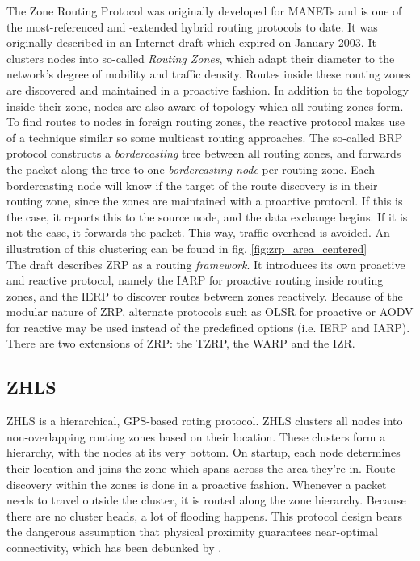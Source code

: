 \documentclass[a4paper,10pt]{scrartcl}
\begin{document}
The Zone Routing Protocol was originally developed for \glspl{MANET} and is one of the most-referenced and -extended hybrid routing protocols to date. It was originally described in an Internet-draft which expired on January 2003\cite{ZRP-Draft}.
It clusters nodes into so-called \emph{Routing Zones}, which adapt their diameter to the network's degree of mobility and traffic density. Routes inside these routing zones are discovered and maintained in a proactive fashion. In addition to the topology inside their zone, nodes are also aware of topology which all routing zones form.
To find routes to nodes in foreign routing zones, the reactive protocol makes use of a technique similar so some multicast routing approaches. The so-called \gls{BRP}\cite{draft-ietf-manet-zone-brp} protocol constructs a \emph{bordercasting} tree between all routing zones, and forwards the packet along the tree to one \emph{bordercasting node} per routing zone. Each bordercasting node will know if the target of the route discovery is in their routing zone, since the zones are maintained with a proactive protocol. If this is the case, it reports this to the source node, and the data exchange begins. If it is not the case, it forwards the packet. This way, traffic overhead is avoided. An illustration of this clustering can be found in fig. \ref{fig:zrp_area_centered}\\
The draft describes ZRP as a routing \emph{framework}. It introduces its own proactive and reactive protocol, namely the \gls{IARP}\cite{draft-ietf-manet-zone-iarp} for proactive routing inside routing zones, and the \gls{IERP}\cite{draft-ietf-manet-zone-ierp} to discover routes between zones reactively. Because of the modular nature of ZRP, alternate protocols such as OLSR for proactive or AODV for reactive may be used instead of the predefined options (i.e. IERP and IARP).\\
There are two extensions of ZRP: the \gls{TZRP}\cite{TZRP}, the \gls{WARP}\cite{WARP} and the \gls{IZR}\cite{IZR}. %

\subsection{\gls{ZHLS}}
\label{subsec:zhls}
ZHLS is a hierarchical, GPS-based roting protocol.
ZHLS clusters all nodes into non-overlapping routing zones based on their location. These clusters form a hierarchy, with the nodes at its very bottom.
On startup, each node determines their location and joins the zone which spans across the area they're in. Route discovery within the zones is done in a proactive fashion. Whenever a packet needs to travel outside the cluster, it is routed along the zone hierarchy. Because there are no cluster heads, a lot of flooding happens. 
This protocol design bears the dangerous assumption that physical proximity guarantees near-optimal connectivity, which has been debunked by \cite{mistaken-axioms}. 
\end{document}
